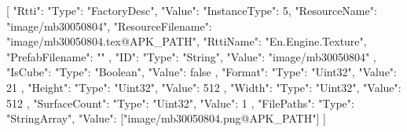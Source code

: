 [{
        "Rtti": {
            "Type": "FactoryDesc",
            "Value": {
                "InstanceType": 5,
                "ResourceName": "image/mb30050804",
                "ResourceFilename": "image/mb30050804.tex@APK_PATH",
                "RttiName": "En.Engine.Texture",
                "PrefabFilename": ""
            }
        },
        "ID": {
            "Type": "String",
            "Value": "image/mb30050804"
        },
        "IsCube": {
            "Type": "Boolean",
            "Value": false
        },
        "Format": {
            "Type": "Uint32",
            "Value": 21
        },
        "Height": {
            "Type": "Uint32",
            "Value": 512
        },
        "Width": {
            "Type": "Uint32",
            "Value": 512
        },
        "SurfaceCount": {
            "Type": "Uint32",
            "Value": 1
        },
        "FilePaths": {
            "Type": "StringArray",
            "Value": ["image/mb30050804.png@APK_PATH"]
        }
    }]